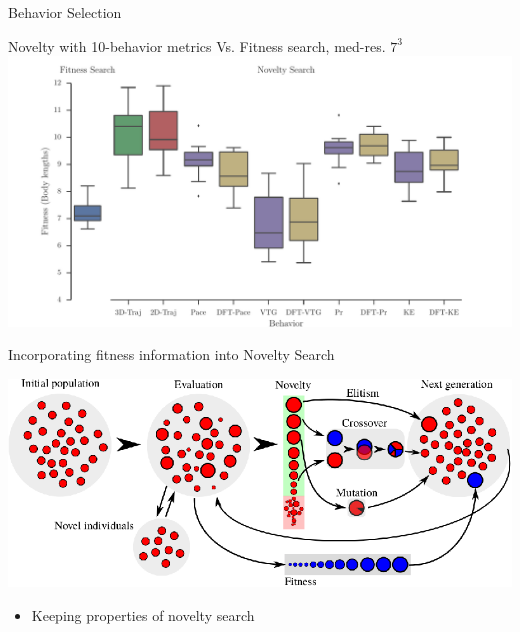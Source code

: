 \documentclass[6pt]{beamer}
\begin{document}
{\begin{frame}{Behavior Selection}
\begin{block}{Novelty with 10-behavior metrics Vs. Fitness search, med-res. $7^3$}
\centering
\includegraphics[width=1.0\textwidth]{../Figures/Results/BehaviorsPerformance.pdf}
\end{block}
\end{frame}


\begin{frame}{Incorporating fitness information into Novelty Search}
\begin{center}
\includegraphics[width=\textwidth]{../Figures/Misc/EvolutionNoveltyFitnessElitism.eps}
\end{center}
\begin{itemize}
\item Keeping properties of novelty search
\end{itemize}
\end{frame}

}
\end{document}
